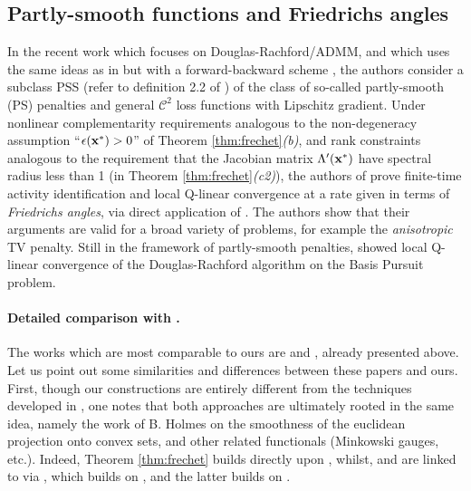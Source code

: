 \subsection{{Partly-smooth functions and Friedrichs angles}} In the
recent work \citep{liang2014activity} which focuses on
Douglas-Rachford/ADMM, and \citep{liang2015activity} which
uses the same ideas as in \citep{liang2014activity} but with a
forward-backward scheme \citep{combettes2005signal},
the authors consider a subclass PSS (refer to definition 2.2 of
  \citep{liang2015activity}) of the class of so-called partly-smooth
  (PS) penalties
and general $\mathcal C^2$ loss functions with Lipschitz
gradient. Under nonlinear complementarity requirements analogous to
the non-degeneracy assumption ``$\epsilon(\mathbf{x}^*) > 0$'' of Theorem
\ref{thm:frechet}\textit{(b)}, and rank constraints analogous to the
requirement that the Jacobian matrix $\Lambda'(\mathbf{x}^*)$
have spectral radius less than 1 (in Theorem
\ref{thm:frechet}\textit{(c2)}), the authors of
\citep{liang2014activity,liang2015activity} prove finite-time activity
identification and local Q-linear convergence at a rate given in terms of
\textit{Friedrichs angles}, via direct application of \cite[Theorem
3.10]{bauschke2014optimal}.
The authors show that their
arguments are valid for a broad variety of problems, for example the
\textit{anisotropic} TV penalty. %
Still in the
framework of partly-smooth penalties, \citep{demanet2013eveventual}
showed local Q-linear convergence of the Douglas-Rachford algorithm on
the Basis Pursuit problem.

\paragraph*{Detailed comparison with
  \citep{liang2014activity,liang2015activity}.} The
works which are most comparable to ours are \citep{liang2014activity}
and \citep{liang2015activity}, already presented above. Let us point
out some similarities and differences between these papers and
ours. First, though our constructions are entirely different from the
techniques developed in
\citep{liang2014activity,liang2015activity}, one notes that both
approaches are ultimately rooted in
the same idea, namely
the work of B. Holmes \citep{holmes1973} on the smoothness of the euclidean
projection onto convex sets, and other related functionals (Minkowski
gauges, etc.). Indeed, Theorem \ref{thm:frechet} builds
directly upon \citep{holmes1973}, whilst, \citep{liang2015activity} and
\citep{liang2014activity} are linked to \citep{holmes1973} via
\citep{wright93}, which builds on \citep{phelps82}, and the latter builds
on \citep{holmes1973}.

